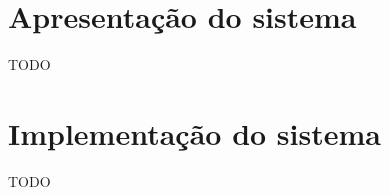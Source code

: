 

\section{Apresentação do sistema}
\label{sec:apresentacaoSistema}

TODO




\section{Implementação do sistema}
\label{sec:implementacaoSistema}

TODO


